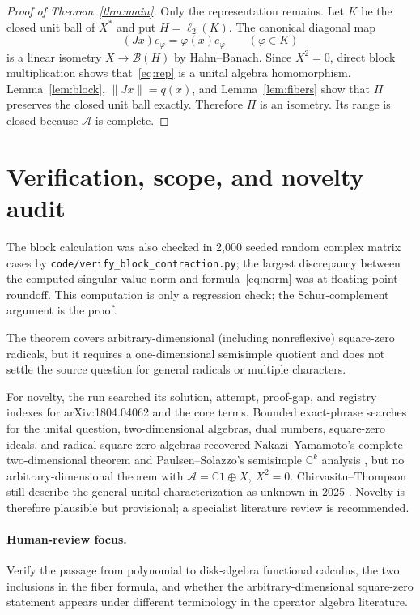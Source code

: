 \documentclass[11pt]{article}
\newcommand{\A}{\mathcal A}
\newcommand{\B}{\mathcal B}
\newcommand{\C}{\mathbb C}
\begin{document}
\begin{proof}[Proof of Theorem~\ref{thm:main}]
Only the representation remains.  Let $K$ be the closed unit ball of $X^*$
and put $H=\ell_2(K)$.  The canonical diagonal map
\[
  (Jx)e_\varphi=\varphi(x)e_\varphi\qquad(\varphi\in K)
\]
is a linear isometry $X\to\B(H)$ by Hahn--Banach.  Since $X^2=0$, direct
block multiplication shows that~\eqref{eq:rep} is a unital algebra
homomorphism.  Lemma~\ref{lem:block}, $\|Jx\|=q(x)$, and
Lemma~\ref{lem:fibers} show that $\Pi$ preserves the closed unit ball exactly.
Therefore $\Pi$ is an isometry.  Its range is closed because $\A$ is complete.
\end{proof}

\section{Verification, scope, and novelty audit}

The block calculation was also checked in 2,000 seeded random complex matrix
cases by \nolinkurl{code/verify_block_contraction.py}; the largest discrepancy
between the computed singular-value norm and formula~\eqref{eq:norm} was at
floating-point roundoff.  This computation is only a regression check; the
Schur-complement argument is the proof.

The theorem covers arbitrary-dimensional (including nonreflexive) square-zero
radicals, but it requires a one-dimensional semisimple quotient and does not
settle the source question for general radicals or multiple characters.

For novelty, the run searched its solution, attempt, proof-gap, and registry
indexes for arXiv:1804.04062 and the core terms.  Bounded exact-phrase searches
for the unital question, two-dimensional algebras, dual numbers, square-zero
ideals, and radical-square-zero algebras recovered Nakazi--Yamamoto's complete
two-dimensional theorem \cite{NY} and Paulsen--Solazzo's semisimple
$\C^k$ analysis \cite{PS}, but no arbitrary-dimensional theorem with
$\A=\C1\oplus X$, $X^2=0$.  Chirvasitu--Thompson still describe the general
unital characterization as unknown in 2025 \cite{CT}.  Novelty is therefore
plausible but provisional; a specialist literature review is recommended.

\paragraph{Human-review focus.}
Verify the passage from polynomial to disk-algebra functional calculus, the
two inclusions in the fiber formula, and whether the arbitrary-dimensional
square-zero statement appears under different terminology in the operator
algebra literature.
\end{document}
